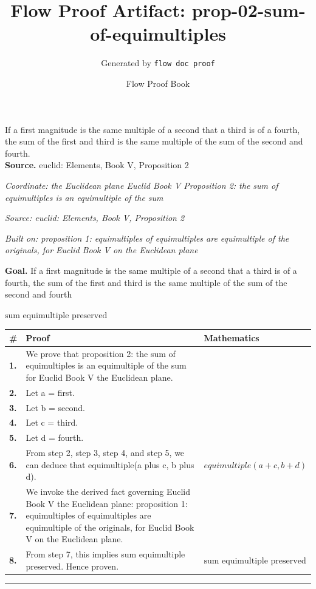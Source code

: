 \documentclass[11pt]{article}
\title{Flow Proof Artifact: prop-02-sum-of-equimultiples}
\author{Generated by \texttt{flow doc proof}}
\date{Flow Proof Book}
\theoremstyle{definition}
\begin{document}
\maketitle
If a first magnitude is the same multiple of a second that a third is of a fourth, the sum of the first and third is the same multiple of the sum of the second and fourth.\\[0.5em]
\textbf{Source.} euclid: Elements, Book V, Proposition 2\\[0.5em]
\bigskip
{}\par
\smallskip\noindent\textit{Coordinate: the Euclidean plane \cdot Euclid Book V \cdot Proposition 2: the sum of equimultiples is an equimultiple of the sum}\par
\smallskip\noindent\textit{Source: euclid: Elements, Book V, Proposition 2}\par
\smallskip\noindent\textit{Built on: proposition 1: equimultiples of equimultiples are equimultiple of the originals, for Euclid Book V on the Euclidean plane}\par
\medskip
\noindent\textbf{Goal.} If a first magnitude is the same multiple of a second that a third is of a fourth, the sum of the first and third is the same multiple of the sum of the second and fourth\par
\noindent$\displaystyle \text{sum equimultiple preserved}$\par
\medskip
\noindent
\begin{tabular}{@{} >{\raggedright\arraybackslash}p{} >{\raggedright\arraybackslash}p{} >{\raggedleft\arraybackslash}p{} @{}}
\textbf{\#} & \textbf{Proof} & \textbf{Mathematics} \\
\midrule
\textbf{1.} & We prove that proposition 2: the sum of equimultiples is an equimultiple of the sum for Euclid Book V the Euclidean plane. & \\[0.45em]
\textbf{2.} & Let a = first. & \\[0.45em]
\textbf{3.} & Let b = second. & \\[0.45em]
\textbf{4.} & Let c = third. & \\[0.45em]
\textbf{5.} & Let d = fourth. & \\[0.45em]
\textbf{6.} & From step 2, step 3, step 4, and step 5, we can deduce that equimultiple(a plus c, b plus d). & $\displaystyle equimultiple(a + c, b + d)$ \\[0.45em]
\textbf{7.} & We invoke the derived fact governing Euclid Book V the Euclidean plane: proposition 1: equimultiples of equimultiples are equimultiple of the originals, for Euclid Book V on the Euclidean plane. & \\[0.45em]
\textbf{8.} & From step 7, this implies sum equimultiple preserved. Hence proven. & $\displaystyle \text{sum equimultiple preserved}$ \\[0.45em]
\bottomrule
\end{tabular}
\label{thm:Geometry-Euclid Book V-proposition_2_the_sum_of_equimultiples_is_an_equimultiple_of_the_sum}
\par\medskip\hrule
\end{document}
